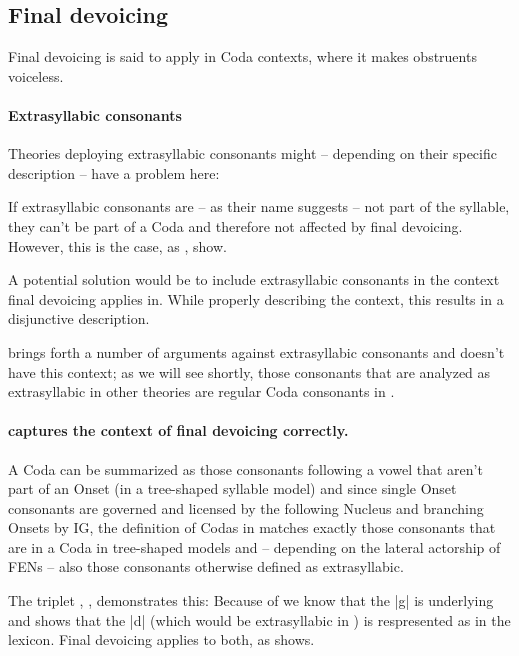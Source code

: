 \subsection{Final devoicing}

Final devoicing is said to apply in Coda contexts,
where it makes obstruents voiceless.

\paragraph{Extrasyllabic consonants}
Theories deploying extrasyllabic consonants might
-- depending on their specific description --
have a problem here:

If extrasyllabic consonants are -- as their name suggests --
not part of the syllable, they can't be part of a Coda
and therefore not affected by final devoicing.
However, this is the case,
as  \ti{[ma:kt]},  \ti{[ja:kt]} show.

A potential solution would be to include extrasyllabic
consonants in the context final devoicing applies in.
While properly describing the context, this results
in a disjunctive description.

\cite{scheer2004} brings forth a number of arguments
against extrasyllabic consonants and \CVCV doesn't
have this context; as we will see shortly, those
consonants that are analyzed as extrasyllabic in other
theories are regular Coda consonants in \CVCV.

\paragraph{\CVCV captures the context of final devoicing correctly.}
A Coda can be summarized as those consonants following
a vowel that aren't part of an Onset
(in a tree-shaped syllable model) and since single Onset
consonants are governed and licensed by the following
Nucleus and branching Onsets by \gls{IG},
the definition of Codas in \CVCV matches exactly those
consonants that are in a Coda in tree-shaped models
and -- depending on the lateral actorship of \glspl{FEN} --
also those consonants otherwise defined as extrasyllabic.

The triplet , , 
demonstrates this: Because of  we know
that the |g| is underlying and  shows
that the |d| (which would be extrasyllabic in )
is respresented as  in the lexicon.
Final devoicing applies to both, as \ti{[ja:kt]} shows.

